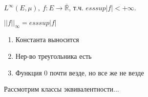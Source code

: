 \begin{definition}
    $L^{\infty} (E, \mu), \ f: E \rightarrow \bar{\mathbb{R}}$, т.ч. $esssup |f| < +\infty$.

    $|| f ||_{\infty} = esssup |f|$

    \begin{enumerate}
        \item Константа выносится
        \item Нер-во треугольника есть
        \item Функция 0 почти везде, но все же не везде
    \end{enumerate}

    Рассмотрим классы эквивалентности...
\end{definition}